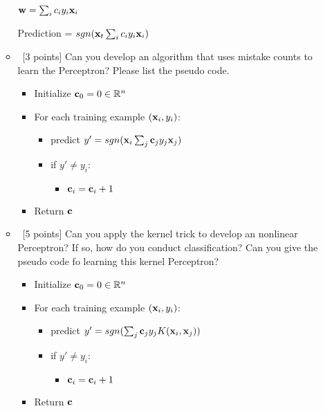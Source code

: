 \documentclass[12pt, fullpage,letterpaper]{article}
\begin{document}
\begin{enumerate}
\begin{itemize}
		${\bf w} = \sum_{i} c_i y_i {\bf x}_i$
		
		Prediction = $sgn({\bf x}_t \sum_{i} c_i y_i {\bf x}_i)$
		
		\bigbreak
		\bigbreak
		\bigbreak
		\bigbreak
		\bigbreak
		
		\item~[3 points] Can you develop an algorithm that uses mistake counts to learn the Perceptron? Please list the pseudo code. 
		
		\begin{itemize}
			\item Initialize ${\bf c}_0 = 0 \in \mathbb{R}^n$
			\item For each training example $({\bf x}_i, y_i)$:
			\begin{itemize}
				\item predict $y' = sgn({\bf x}_i \sum_{j} {\bf c}_j y_j {\bf x}_j)$
				\item if $y' \ne y_i$:
					\begin{itemize}
						\item ${\bf c}_i = {\bf c}_i + 1$
					\end{itemize}
			\end{itemize}
			\item Return ${\bf c}$
		\end{itemize}
		
		\item~[5 points] Can you apply the kernel trick to develop an nonlinear Perceptron? If so, how do you conduct classification? Can you give the pseudo code fo learning this kernel Perceptron? 
		
		\begin{itemize}
			\item Initialize ${\bf c}_0 = 0 \in \mathbb{R}^n$
			\item For each training example $({\bf x}_i, y_i)$:
			\begin{itemize}
				\item predict $y' = sgn(\sum_{j} {\bf c}_j y_j K({\bf x}_i, {\bf x}_j))$
				\item if $y' \ne y_i$: 
				\begin{itemize}
					\item ${\bf c}_i = {\bf c}_i + 1$
				\end{itemize}
			\end{itemize}
			\item Return ${\bf c}$
		\end{itemize}
	
	\end{itemize}   
	
\end{enumerate}
\end{document}
